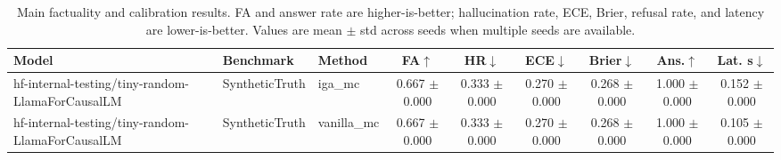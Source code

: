 \begin{table}[t]
\centering
\caption{Main factuality and calibration results. FA and answer rate are higher-is-better; hallucination rate, ECE, Brier, refusal rate, and latency are lower-is-better. Values are mean $\pm$ std across seeds when multiple seeds are available.}
\label{tab:main_results}
\small
\begin{tabular}{lllcccccc}
\toprule
Model & Benchmark & Method & FA$\uparrow$ & HR$\downarrow$ & ECE$\downarrow$ & Brier$\downarrow$ & Ans.$\uparrow$ & Lat. s$\downarrow$ \\
\midrule
hf-internal-testing/tiny-random-LlamaForCausalLM & SyntheticTruth & iga\_mc & 0.667 $\pm$ 0.000 & 0.333 $\pm$ 0.000 & 0.270 $\pm$ 0.000 & 0.268 $\pm$ 0.000 & 1.000 $\pm$ 0.000 & 0.152 $\pm$ 0.000 \\
hf-internal-testing/tiny-random-LlamaForCausalLM & SyntheticTruth & vanilla\_mc & 0.667 $\pm$ 0.000 & 0.333 $\pm$ 0.000 & 0.270 $\pm$ 0.000 & 0.268 $\pm$ 0.000 & 1.000 $\pm$ 0.000 & 0.105 $\pm$ 0.000 \\
\bottomrule
\end{tabular}
\end{table}
